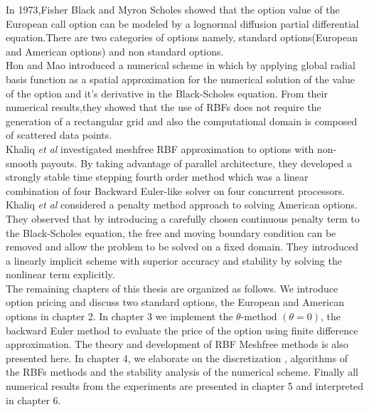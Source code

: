 \documentclass[12pt]{article}
\numberwithin{equation}{subsection} %
\begin{document}
 In 1973,Fisher Black and Myron Scholes showed that the option value
of the European call option can be modeled by a lognormal diffusion
partial differential equation.There are two categories of options
namely, standard options(European and American options) and non
standard options.\\
     Hon and Mao\cite{Hon} introduced a numerical scheme in which by
 applying global radial basis function as a spatial approximation
 for the numerical solution  of the  value of the option
 and it's derivative in the Black-Scholes equation. From their
 numerical results,they showed that the use of RBFs does not require
 the generation of a rectangular grid and also the computational
 domain is composed of scattered data points.\\
    Khaliq \textit{et al}\cite{KK} investigated meshfree RBF approximation to
 options with non-smooth payouts. By taking advantage of parallel
 architecture, they developed a strongly stable time stepping fourth
 order method which was a linear combination of four Backward
 Euler-like solver on four concurrent processors.
    Khaliq \textit{et al}\cite{ADS06} considered a penalty method
 approach to solving  American options. They observed that by
 introducing a carefully chosen continuous penalty term to the
 Black-Scholes equation, the free and moving boundary condition can
 be removed and allow the problem to be solved on a fixed
 domain. They introduced a linearly implicit scheme with superior
 accuracy and stability by solving the nonlinear term explicitly.\\
   The remaining chapters of this thesis are organized  as follows.
 We introduce option pricing and discuss two standard options,
 the European and American options in chapter 2. In chapter 3 we
 implement the $\theta$-method $(\theta=0)$, the backward Euler
 method to evaluate the price of the option using finite difference approximation. The theory and development of
RBF Meshfree methods  is also presented here. In chapter 4, we
elaborate on the discretization , algorithms of the RBFs methods and
the stability analysis  of the numerical scheme. Finally all
numerical results from the experiments are presented in chapter 5
and interpreted in chapter 6.

%
\end{document}
